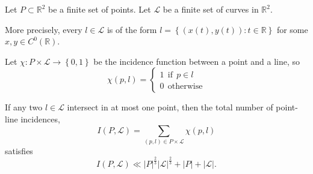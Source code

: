 \documentclass[12pt]{amsart}
\begin{document}
\begin{theorem}
Let \(P \subset \mathbb{R} ^{2}\) be a finite set of points. Let \(\mathcal{L} \) be a finite set of curves in \(\mathbb{R} ^{2}\). 

More precisely,
every \(l \in \mathcal{L} \) is of the form \(l = \left\{ (x(t),y(t)) : t\in \mathbb{R}  \right\} \) for some \(x,y \in C^{0}(\mathbb{R} )\). 

Let \(\chi : P \times \mathcal{L}  \to \left\{ 0,1 \right\} \) be the incidence function
between a point and a line, so
\[
\chi(p,l) = 
\begin{cases}
1 ~ ~ \text{if} ~ ~ p\in l\\
0 ~ ~ \text{otherwise} 
\end{cases}
\]

If any two \( l \in \mathcal{L} \) intersect in at most one point,
then the total number of point-line incidences,
\[
    I(P, \mathcal{L} ) = \sum _{(p,l)\in P \times \mathcal{L} } \chi(p,l)
\]
satisfies
\[
    I(P,\mathcal{L} ) \ll  \left\lvert P \right\rvert^{\frac{2}{3} } \left\lvert \mathcal{L}  \right\rvert ^{\frac{2}{3} } + \left\lvert P \right\rvert + \left\lvert \mathcal{L}  \right\rvert 
.\]
\end{theorem}
\end{document}
